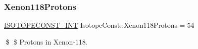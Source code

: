 \subsubsection{\texorpdfstring{Xenon118\+Protons}{Xenon118Protons}}
{\footnotesize\ttfamily \mbox{\hyperlink{group___isotope_const-_macros_ga5f18360b3e99483a35c32d789e62621c}{I\+S\+O\+T\+O\+P\+E\+C\+O\+N\+S\+T\+\_\+\+I\+NT}} Isotope\+Const\+::\+Xenon118\+Protons = 54}

\$ \$ Protons in Xenon-\/118. 